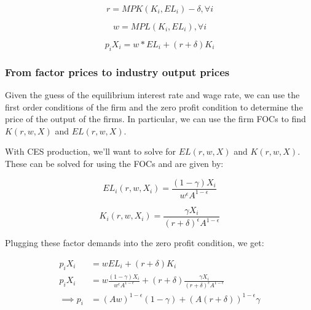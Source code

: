 \documentclass[letterpaper,12pt]{article}
\theoremstyle{definition}
\begin{document}
\begin{spacing}{1.5}
\begin{equation}
r = MPK(K_{i},EL_{i}) - \delta, \forall i
\end{equation}

\begin{equation}
w = MPL(K_{i},EL_{i}), \forall i
\end{equation}

\begin{equation}
p_{i}X_{i}= w*EL_{i} + (r+\delta)K_{i}
\end{equation}
 
 
\subsubsection*{From factor prices to industry output prices}

Given the guess of the equilibrium interest rate and wage rate, we can use the first order conditions of the firm and the zero profit condition to determine the price of the output of the firms.  In particular, we can use the firm FOCs to find $K(r,w,X)$ and $EL(r,w,X)$.  

With CES production, we'll want to solve for $EL(r,w,X)$ and $K(r,w,X)$.  These can be solved for using the FOCs and are given by:

\begin{equation}
\label{eqn:l_demand}
EL_{i}(r,w,X_{i})=\frac{(1-\gamma)X_{i}}{w^{\epsilon}A^{1-\epsilon}}
\end{equation}

\begin{equation}
\label{eqn:k_demand}
K_{i}(r,w,X_{i})=\frac{\gamma X_{i}}{(r+\delta)^{\epsilon}A^{1-\epsilon}}
\end{equation}

Plugging these factor demands into the zero profit condition, we get:

\begin{equation}
\label{eqn:prices}
\begin{split}
p_{i}X_{i} &= w EL_{i} + (r+\delta)K_{i} \\
p_{i}X_{i} &= w \frac{(1-\gamma)X_{i}}{w^{\epsilon}A^{1-\epsilon}} + (r+\delta)\frac{\gamma X_{i}}{(r+\delta)^{\epsilon}A^{1-\epsilon}} \\
\implies p_{i} & = (Aw)^{1-\epsilon}(1-\gamma) + (A(r+\delta))^{1-\epsilon} \gamma
\end{split}
\end{equation}



\end{spacing}
\end{document}
